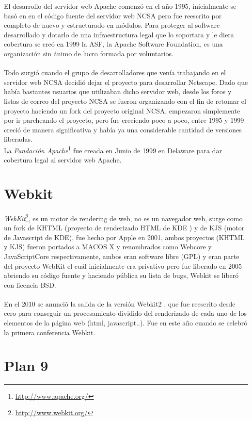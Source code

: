 \documentclass[a4paper,oneside,11pt]{article}
\begin{document}
El desarrollo del servidor web Apache comenz\'o en el año 1995, inicialmente se bas\'o en en el c\'odigo fuente del servidor web NCSA
pero fue reescrito por completo de nuevo y estructurado en m\'odulos. Para proteger al software desarrollado y dotarlo de una
infraestructura legal que lo soportara y le diera cobertura se cre\'o en 1999 la ASF, la Apache Software Foundation, es una
organizaci\'on sin \'animo de lucro formada por voluntarios.\\
\\
Todo surgi\'o cuando el grupo de desarrolladores que ven\'ia trabajando en el servidor web NCSA decidi\'o dejar el proyecto para desarrollar Netscape.
Dado que hab\'ia bastantes usuarios que utilizaban dicho servidor web, desde los foros y listas de correo del proyecto NCSA se fueron organizando con 
el fin de retomar el proyecto haciendo un fork del proyecto original NCSA, empezaron simplemente por ir parcheando el proyecto, pero
fue creciendo poco a poco, entre 1995 y 1999 creci\'o de manera significativa y hab\'ia ya una considerable cantidad de versiones liberadas.
\\
La \emph{Fundación Apache}\footnote{\url{http://www.apache.org/}} fue creada en Junio de 1999 en Delaware para dar cobertura legal al servidor web Apache.

\section{Webkit}

\emph{WebKit}\footnote{\url{http://www.webkit.org/}}, es un motor de rendering de web, no es un navegador web, surge como un fork de KHTML (proyecto de renderizado HTML de KDE )
 y de KJS (motor de Javascript de KDE), fue hecho por Apple en 2001, ambos proyectos (KHTML y KJS) fueron portados a MACOS X  y renombrados como Webcore y 
JavaScriptCore respectivamente, ambos eran software libre (GPL) y eran parte del proyecto WebKit el cu\'al inicialmente era privativo pero fue 
liberado en 2005 abriendo su c\'odigo fuente y haciendo p\'ublica su lista de bugs, Webkit se liber\'o con licencia BSD.\\
\\
En el 2010 se anunci\'o la salida de la versi\'on Webkit2 , que fue reescrito desde cero para conseguir un procesamiento dividido
del renderizado de cada uno de los elementos de la p\'agina web (html, javascript..). Fue en este año cuando se celebr\'o la primera 
conferencia Webkit.

\section{Plan 9}
\end{document}
